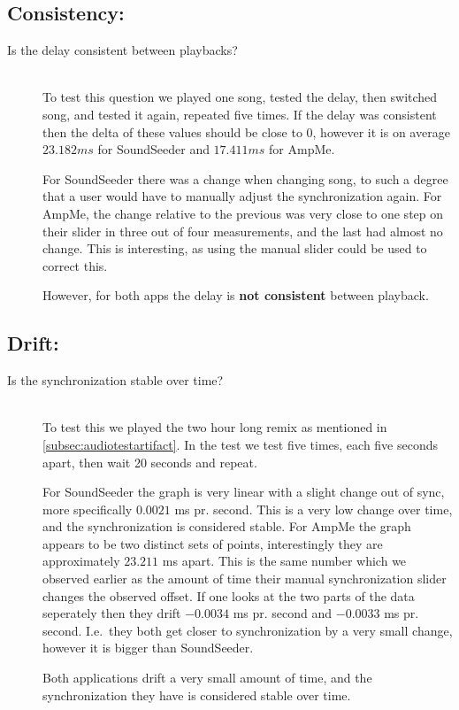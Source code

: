 \subsection*{Consistency:}
\begin{description}
    \item[Is the delay consistent between playbacks?] \hfill \\
    To test this question we played one song, tested the delay, then switched song, and tested it again, repeated five times.
    If the delay was consistent then the delta of these values should be close to $0$, however it is on average $23.182 ms$ for SoundSeeder and $17.411 ms$ for AmpMe.

    For SoundSeeder there was a change when changing song, to such a degree that a user would have to manually adjust the synchronization again.
    For AmpMe, the change relative to the previous was very close to one step on their slider in three out of four measurements, and the last had almost no change.
    This is interesting, as using the manual slider could be used to correct this.

    However, for both apps the delay is \textbf{not consistent} between playback.
\end{description}

\subsection*{Drift:}
\begin{description}
    \item[Is the synchronization stable over time?] \hfill \\
    To test this we played the two hour long remix as mentioned in \vref{subsec:audiotestartifact}.
    In the test we test five times, each five seconds apart, then wait 20 seconds and repeat.

    For SoundSeeder the graph is very linear with a slight change out of sync, more specifically $0.0021$ ms pr. second.
    This is a very low change over time, and the synchronization is considered stable.
    For AmpMe the graph appears to be two distinct sets of points, interestingly they are approximately $23.211$ ms apart.
    This is the same number which we observed earlier as the amount of time their manual synchronization slider changes the observed offset.
    If one looks at the two parts of the data seperately then they drift $-0.0034$ ms pr. second and $-0.0033$ ms pr. second.
    I.e.~they both get closer to synchronization by a very small change, however it is bigger than SoundSeeder.

    Both applications drift a very small amount of time, and the synchronization they have is considered stable over time.
\end{description}

